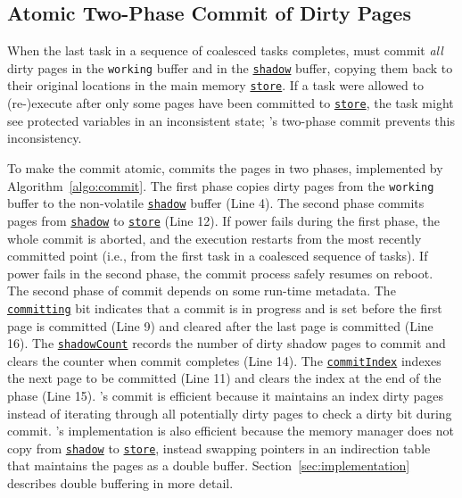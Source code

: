 %

\subsection{Atomic Two-Phase Commit of Dirty Pages}

When the last task in a sequence of coalesced tasks completes, \sys must commit
\emph{all} dirty pages in the \texttt{working} buffer and in the
\texttt{\underline{shadow}} buffer, copying them back to their original
locations in the main memory \texttt{\underline{store}}. If a task were allowed
to (re-)execute after only some pages have been committed to
\texttt{\underline{store}}, the task might see protected variables in an
inconsistent state; \sys's two-phase commit prevents this inconsistency.

To make the commit atomic, \sys commits the pages in two phases, implemented by
Algorithm~\ref{algo:commit}.
%
The first phase copies dirty pages from the \texttt{working} buffer to the
non-volatile \texttt{\underline{shadow}} buffer (Line 4). The second phase
commits pages from \texttt{\underline{shadow}} to \texttt{\underline{store}}
(Line 12).  If power fails during the first phase, the whole commit is aborted,
and the execution restarts from the most recently committed point (i.e., from
the first task in a coalesced sequence of tasks). If power fails in the second
phase, the commit process safely resumes on reboot.  The second phase of commit
depends on some run-time metadata. The \texttt{\underline{committing}} bit
indicates that a commit is in progress and is set before the first page is
committed (Line 9) and cleared after the last page is committed (Line 16).  The
\texttt{\underline{shadowCount}} records the number of dirty shadow pages to
commit and \sys clears the counter when commit completes (Line 14).  The
\texttt{\underline{commitIndex}} indexes the next page to be committed (Line
11) and \sys clears the index at the end of the phase (Line 15).
%
\sys's commit is efficient because it maintains an index dirty pages instead of
iterating through all potentially dirty pages to check a dirty bit during
commit. 
%
\sys's implementation is also efficient because the memory manager does not
copy from \texttt{\underline{shadow}} to \texttt{\underline{store}}, instead
swapping pointers in an indirection table that maintains the pages as a double
buffer.  Section~\ref{sec:implementation} describes double buffering in more
detail.

